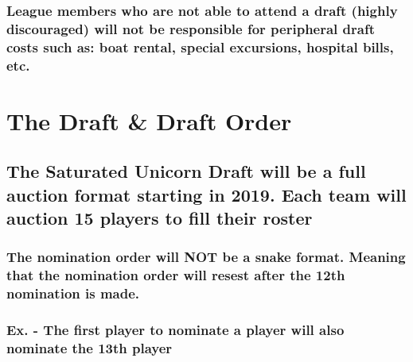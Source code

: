 \documentclass[
]{book}
\begin{document}
\hypertarget{league-members-who-are-not-able-to-attend-a-draft-highly-discouraged-will-not-be-responsible-for-peripheral-draft-costs-such-as-boat-rental-special-excursions-hospital-bills-etc.}{%
\subsubsection{League members who are not able to attend a draft (highly discouraged) will not be responsible for peripheral draft costs such as: boat rental, special excursions, hospital bills, etc.}\label{league-members-who-are-not-able-to-attend-a-draft-highly-discouraged-will-not-be-responsible-for-peripheral-draft-costs-such-as-boat-rental-special-excursions-hospital-bills-etc.}}

\hypertarget{the-draft-draft-order}{%
\section{The Draft \& Draft Order}\label{the-draft-draft-order}}

\hypertarget{the-saturated-unicorn-draft-will-be-a-full-auction-format-starting-in-2019.-each-team-will-auction-15-players-to-fill-their-roster}{%
\subsection{The Saturated Unicorn Draft will be a full auction format starting in 2019. Each team will auction 15 players to fill their roster}\label{the-saturated-unicorn-draft-will-be-a-full-auction-format-starting-in-2019.-each-team-will-auction-15-players-to-fill-their-roster}}

\hypertarget{the-nomination-order-will-not-be-a-snake-format.-meaning-that-the-nomination-order-will-resest-after-the-12th-nomination-is-made.}{%
\subsubsection{The nomination order will NOT be a snake format. Meaning that the nomination order will resest after the 12th nomination is made.}\label{the-nomination-order-will-not-be-a-snake-format.-meaning-that-the-nomination-order-will-resest-after-the-12th-nomination-is-made.}}

\hypertarget{ex.---the-first-player-to-nominate-a-player-will-also-nominate-the-13th-player}{%
\subsubsection{Ex. - The first player to nominate a player will also nominate the 13th player}\label{ex.---the-first-player-to-nominate-a-player-will-also-nominate-the-13th-player}}
\end{document}
